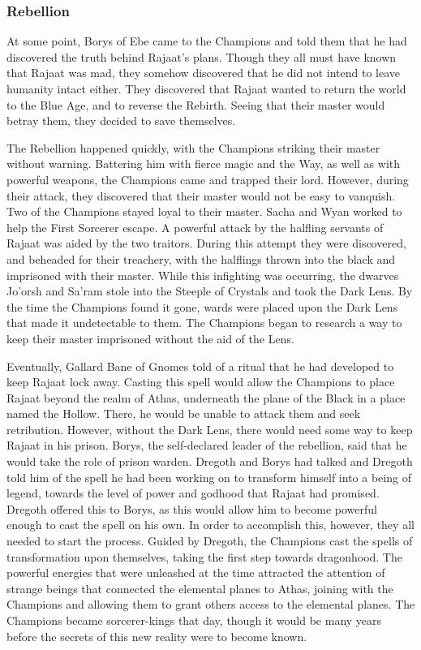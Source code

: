 \subsubsection{Rebellion}
At some point, Borys of Ebe came to the Champions and told them that he had discovered the truth behind Rajaat's plans. Though they all must have known that Rajaat was mad, they somehow discovered that he did not intend to leave humanity intact either. They discovered that Rajaat wanted to return the world to the Blue Age, and to reverse the Rebirth. Seeing that their master would betray them, they decided to save themselves.

The Rebellion happened quickly, with the Champions striking their master without warning. Battering him with fierce magic and the Way, as well as with powerful weapons, the Champions came and trapped their lord. However, during their attack, they discovered that their master would not be easy to vanquish. Two of the Champions stayed loyal to their master. Sacha and Wyan worked to help the First Sorcerer escape. A powerful attack by the halfling servants of Rajaat was aided by the two traitors. During this attempt they were discovered, and beheaded for their treachery, with the halflings thrown into the black and imprisoned with their master. While this infighting was occurring, the dwarves Jo'orsh and Sa'ram stole into the Steeple of Crystals and took the Dark Lens. By the time the Champions found it gone, wards were placed upon the Dark Lens that made it undetectable to them. The Champions began to research a way to keep their master imprisoned without the aid of the Lens.

Eventually, Gallard Bane of Gnomes told of a ritual that he had developed to keep Rajaat lock away. Casting this spell would allow the Champions to place Rajaat beyond the realm of Athas, underneath the plane of the Black in a place named the Hollow. There, he would be unable to attack them and seek retribution. However, without the Dark Lens, there would need some way to keep Rajaat in his prison. Borys, the self-declared leader of the rebellion, said that he would take the role of prison warden. Dregoth and Borys had talked and Dregoth told him of the spell he had been working on to transform himself into a being of legend, towards the level of power and godhood that Rajaat had promised. Dregoth offered this to Borys, as this would allow him to become powerful enough to cast the spell on his own. In order to accomplish this, however, they all needed to start the process. Guided by Dregoth, the Champions cast the spells of transformation upon themselves, taking the first step towards dragonhood. The powerful energies that were unleashed at the time attracted the attention of strange beings that connected the elemental planes to Athas, joining with the Champions and allowing them to grant others access to the elemental planes. The Champions became sorcerer-kings that day, though it would be many years before the secrets of this new reality were to become known.

